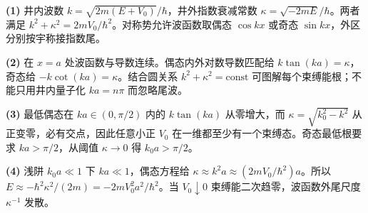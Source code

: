 \par\noindent\textbf{(1)} 井内波数 \(k=\sqrt{2m(E+V_0)}/\hbar\)，井外指数衰减常数 \(\kappa=\sqrt{-2mE}/\hbar\)。两者满足 \(k^2+\kappa^2=2mV_0/\hbar^2\)。对称势允许波函数取偶态 \(\cos kx\) 或奇态 \(\sin kx\)，外区分别按宇称接指数尾。
\par\noindent\textbf{(2)} 在 \(x=a\) 处波函数与导数连续。偶态内外对数导数匹配给 \(k\tan(ka)=\kappa\)，奇态给 \(-k\cot(ka)=\kappa\)。结合圆关系 \(k^2+\kappa^2=\mathrm{const}\) 可图解每个束缚能根；不能只用井内量子化 \(ka=n\pi\) 而忽略尾波。
\par\noindent\textbf{(3)} 最低偶态在 \(ka\in(0,\pi/2)\) 内的 \(k\tan(ka)\) 从零增大，而 \(\kappa=\sqrt{k_0^2-k^2}\) 从正变零，必有交点，因此任意小正 \(V_0\) 在一维都至少有一个束缚态。奇态最低根要求 \(ka>\pi/2\)，从阈值 \(\kappa\to0\) 得 \(k_0a>\pi/2\)。
\par\noindent\textbf{(4)} 浅阱 \(k_0a\ll1\) 下 \(ka\ll1\)，偶态方程给 \(\kappa\approx k^2a\approx(2mV_0/\hbar^2)a\)。所以 \(E\approx-\hbar^2\kappa^2/(2m)=-2mV_0^2a^2/\hbar^2\)。当 \(V_0\downarrow0\) 束缚能二次趋零，波函数外尾尺度 \(\kappa^{-1}\) 发散。
